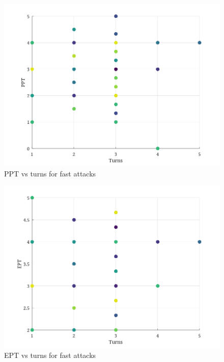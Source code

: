 \begin{figure}[ht]
\includegraphics[keepaspectratio,width=\textwidth]{octave/pptvst.png}
  \caption{PPT vs turns for fast attacks\label{fig:pptvst}}
\end{figure}

\begin{figure}[hb]
\includegraphics[keepaspectratio,width=\textwidth]{octave/eptvst.png}
  \caption{EPT vs turns for fast attacks\label{fig:eptvst}}
\end{figure}

